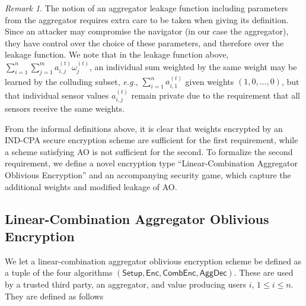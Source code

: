 \documentclass[10pt,letterpaper,oneside,twocolumn,journal]{IEEEtran}
\theoremstyle{definition}
\theoremstyle{definition}
\theoremstyle{remark}
\newtheorem*{remark}{Remark}
\begin{document}
\begin{remark} \label{rem:lcao_leakage}
    The notion of an aggregator leakage function including parameters from the aggregator requires extra care to be taken when giving its definition. Since an attacker may compromise the navigator (in our case the aggregator), they have control over the choice of these parameters, and therefore over the leakage function. We note that in the leakage function above, $\sum^n_{i=1}\sum^m_{j=1}a^{(t)}_{i,j}\omega^{(t)}_j$, an individual sum weighted by the same weight may be learned by the colluding subset, \textit{e.g.}, $\sum^n_{i=1}a^{(t)}_{i,1}$ given weights $(1,0,\dots,0)$, but that individual sensor values $a^{(t)}_{i,j}$ remain private due to the requirement that all sensors receive the same weights.
\end{remark}

From the informal definitions above, it is clear that weights encrypted by an IND-CPA secure encryption scheme are sufficient for the first requirement, while a scheme satisfying AO is not sufficient for the second. To formalize the second requirement, we define a novel encryption type ``Linear-Combination Aggregator Oblivious Encryption'' and an accompanying security game, which capture the additional weights and modified leakage of AO.

% 
% 

\subsection{Linear-Combination Aggregator Oblivious Encryption} \label{subsec:lcao}
We let a linear-combination aggregator oblivious encryption scheme be defined as a tuple of the four algorithms $(\mathsf{Setup}, \mathsf{Enc}, \mathsf{CombEnc}, \mathsf{AggDec})$. These are used by a trusted third party, an aggregator, and value producing users $i,\,1\leq i \leq n$. They are defined as follows
\end{document}
